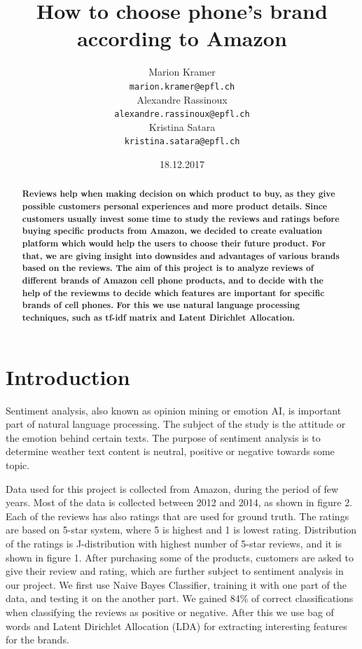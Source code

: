 \documentclass[11pt]{article}
\title{How to choose phone's brand according to Amazon}
\author{Marion Kramer\\
  {\tt marion.kramer@epfl.ch} \\\And
  Alexandre Rassinoux \\
  {\tt alexandre.rassinoux@epfl.ch} \\\And
Kristina Satara \\
{\tt kristina.satara@epfl.ch} \\}
\date{18.12.2017}
\begin{document}
\maketitle
\begin{abstract}
\textbf {Reviews help when making decision on which product to buy, as they give possible customers personal experiences and more product details. Since customers usually invest some time to study the reviews and ratings before buying specific products from Amazon, we decided to create evaluation platform which would help the users to choose their future product. For that, we are giving insight into  downsides and advantages of various brands based on the reviews. The aim of this project is to analyze reviews of different brands of Amazon cell phone products, and to decide with the help of the reviewms to decide which features are important for specific brands of cell phones. For this we use natural language processing techniques, such as tf-idf matrix and Latent Dirichlet Allocation.}
\end{abstract}


\section{Introduction}
Sentiment analysis, also known as opinion mining or emotion AI, is important part of natural language processing. The subject of the study is the attitude or the emotion behind certain texts. The purpose of sentiment analysis is to determine weather text content is neutral, positive or negative towards some topic. 

Data used for this project is collected from Amazon, during the period of few years. Most of the data is collected between 2012 and 2014, as shown in figure 2. Each of the reviews has also ratings that are used for ground truth. The ratings are based on 5-star system, where 5 is highest and 1 is lowest rating. Distribution of the ratings is J-distribution with highest number of 5-star reviews, and it is shown in figure 1. After purchasing some of the products, customers are asked to give their review and rating, which are further subject to sentiment analysis in our project. We first use Naive Bayes Classifier, training it with one part of the data, and testing it on the another part. We gained 84\% of correct classifications when classifying the reviews as positive or negative. After this we use bag of words and Latent Dirichlet Allocation (LDA) for extracting interesting features for the brands. 
\end{document}

